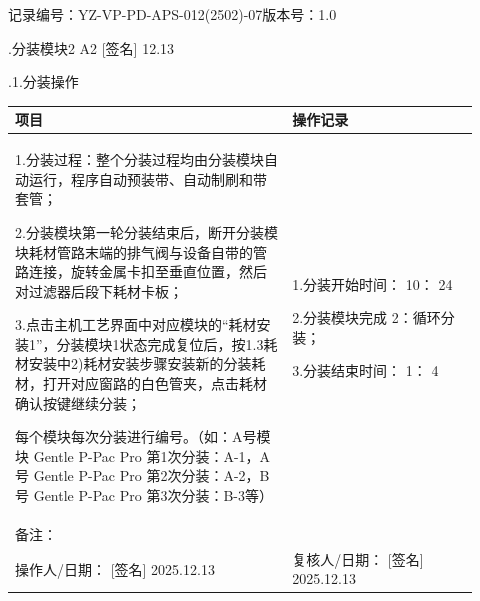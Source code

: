\documentclass[UTF8,10pt,a4paper,fontset=fandol]{ctexart}
\newcommand{\fieldvalue}[1]{#1}
\newcommand{\handwritten}[1]{#1}
\begin{document}
\noindent
记录编号：YZ-VP-PD-APS-012(2502)-07\qquad 版本号：1.0

\medskip

.\quad 分装模块2
\fieldvalue{\handwritten{A2 [签名] 12.13}}

\medskip

.1.\quad 分装操作

\begin{center}
\small
\begin{tabular}{|p{0.55\linewidth}|p{0.37\linewidth}|}
\hline
项目 & 操作记录\\
\hline
1.分装过程：整个分装过程均由分装模块自动运行，程序自动预装带、自动制刷和带套管；
 
2.分装模块第一轮分装结束后，断开分装模块耗材管路末端的排气阀与设备自带的管路连接，旋转金属卡扣至垂直位置，然后对过滤器后段下耗材卡板；

3.点击主机工艺界面中对应模块的“耗材安装1”，分装模块1状态完成复位后，按1.3耗材安装中2)耗材安装步骤安装新的分装耗材，打开对应窗路的白色管夹，点击耗材确认按键继续分装；

每个模块每次分装进行编号。（如：A号模块 Gentle P-Pac Pro 第1次分装：A-1，A号 Gentle P-Pac Pro 第2次分装：A-2，B号 Gentle P-Pac Pro 第3次分装：B-3等）
&
1.分装开始时间：
\fieldvalue{\handwritten{10}}：
\fieldvalue{\handwritten{24}}

2.分装模块完成
\fieldvalue{\handwritten{2}}：循环分装；

3.分装结束时间：
\fieldvalue{\handwritten{1}}：
\fieldvalue{\handwritten{4}}
\\
\hline
备注： & \\
\hline
操作人/日期：
\fieldvalue{\handwritten{[签名]}}
\quad
\fieldvalue{\handwritten{2025.12.13}}
&
复核人/日期：
\fieldvalue{\handwritten{[签名]}}
\quad
\fieldvalue{\handwritten{2025.12.13}}
\\
\hline
\end{tabular}
\end{center}
\end{document}
